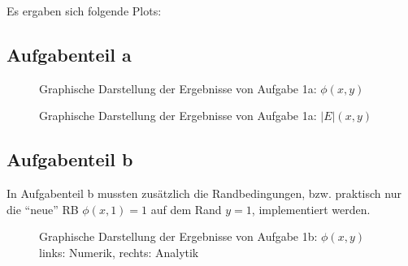 Es ergaben sich folgende Plots:

\subsection*{Aufgabenteil a}

\begin{landscape}
	\begin{figure}
		\caption{Graphische Darstellung der Ergebnisse von Aufgabe 1a: $\phi(x,y)$}
		\label{fig:aPhi}
	\end{figure}
\end{landscape} 

\begin{landscape}
	\begin{figure}
		\caption{Graphische Darstellung der Ergebnisse von Aufgabe 1a: $|E|(x,y)$}
		\label{fig:aabsE}
	\end{figure}
\end{landscape} 


\subsection*{Aufgabenteil b}
In Aufgabenteil b mussten zusätzlich die Randbedingungen, bzw. praktisch nur die \enquote{neue} RB $\phi(x,1)=1$ auf dem Rand $y=1$, implementiert werden.

\begin{landscape}
	\begin{figure}
		\caption{Graphische Darstellung der Ergebnisse von Aufgabe 1b: $\phi(x,y)$\\links: Numerik, rechts: Analytik}
		\label{fig:bPhi}
	\end{figure}
\end{landscape} 


